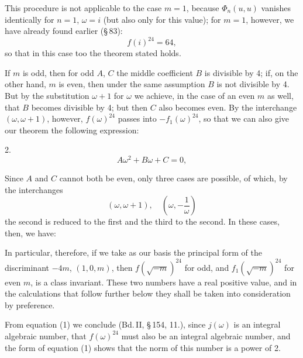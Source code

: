 

This procedure is not applicable to the case $m=1$, because $\Phi_n(u,u)$ vanishes identically for $n=1$, $\omega=i$ (but also only for this value); for $m=1$, however, we have already found earlier (\S\,83):
\[
f(i)^{24}=64,
\]
so that in this case too the theorem stated holds.

If $m$ is odd, then for odd $A$, $C$ the middle coefficient $B$ is divisible by 4; if, on the other hand, $m$ is even, then under the same assumption $B$ is not divisible by 4. But by the substitution $\omega+1$ for $\omega$ we achieve, in the case of an even $m$ as well, that $B$ becomes divisible by 4; but then $C$ also becomes even. By the interchange $(\omega,\omega+1)$, however, $f(\omega)^{24}$ passes into $-f_1(\omega)^{24}$, so that we can also give our theorem the following expression:

2. 
\[
A\omega^2+B\omega+C=0,
\]

Since $A$ and $C$ cannot both be even, only three cases are possible, of which, by the interchanges
\[
(\omega,\omega+1),\quad \left(\omega,-\frac{1}{\omega}\right)
\]
the second is reduced to the first and the third to the second. In these cases, then, we have:

In particular, therefore, if we take as our basis the principal form of the discriminant $-4m$, $(1,0,m)$, then $f(\sqrt{-m})^{24}$ for odd, and $f_1(\sqrt{-m})^{24}$ for even $m$, is a class invariant. These two numbers have a real positive value, and in the calculations that follow further below they shall be taken into consideration by preference.

From equation (1) we conclude (Bd.\,II, \S\,154, 11.), since $j(\omega)$ is an integral algebraic number, that $f(\omega)^{24}$ must also be an integral algebraic number, and the form of equation (1) shows that the norm of this number is a power of 2.
